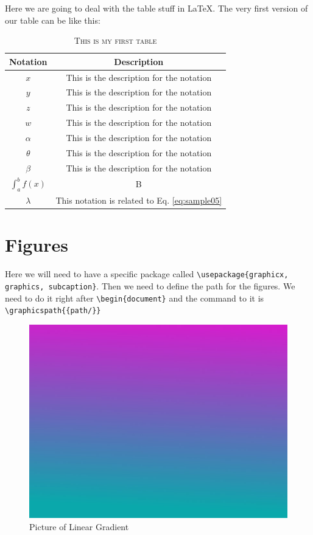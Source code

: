 \documentclass{article}
\begin{document}
Here we are going to deal with the table stuff in \LaTeX.
The very first version of our table can be like this:
\begin{table}[H] %
	\centering
	\caption{\textsc{This is my first table}}
	\label{tab:myfirsttab}
	\begin{tabular}{c || c} %
		\textbf{Notation} & \textbf{Description} \\ \hline \hline
		$x$ & This is the description for the notation\\ \hline
		$y$ & This is the description for the notation\\ \hline
		$z$ & This is the description for the notation\\ \hline
		$w$ & This is the description for the notation\\ \hline
		$\alpha$ & This is the description for the notation\\ \hline
		$\theta$ & This is the description for the notation\\ \hline
		$\beta$ & This is the description for the notation\\ \hline
		$\int_{a}^{b} f(x)$ & B\\ \hline
		$\lambda$ & This notation is related to  Eq. \ref{eq:sample05} \\
		\hline
	\end{tabular}
\end{table}


\section{Figures}
\label{sec:figures}

Here we will need to have a specific package called \verb|\usepackage{graphicx, graphics, subcaption}|. Then we need to define the path for the figures. We need to do it right after \verb|\begin{document}|
and the command to it is \verb|\graphicspath{{path/}}|

\begin{figure}[ht]
	\centering
	\includegraphics[width=.5\linewidth]{fig1.jpg}
	\caption{Picture of Linear Gradient}
	\label{fig:linearcolors}
\end{figure}
\end{document}
